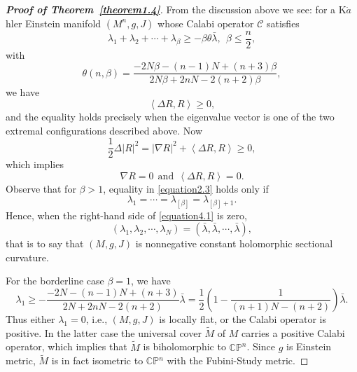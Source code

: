 \documentclass{amsart}
\theoremstyle{definition}
\theoremstyle{remark}
\numberwithin{equation}{section}
\begin{document}
\begin{proof}[{\bf Proof of Theorem~\ref{theorem1.4}}]
From the discussion above we see:  for a K$\ddot a$hler Einstein manifold $\left( M^n,g,J \right)$ whose Calabi operator $\mathcal{C}$ satisfies
 $${\lambda _1} + {\lambda _2} +  \cdots  + {\lambda _\beta} \ge  - \beta\theta \bar \lambda, \ \ \beta \le \frac{n}{2},$$
 with
$$ \theta \left( {n,\beta} \right) = \frac{{ - 2N\beta - \left( {n - 1} \right)N + \left( {n + 3} \right)\beta}}{{2N\beta + 2nN - 2\left( {n + 2} \right)\beta}},$$
we have
$$\left\langle {\Delta R,R} \right\rangle  \ge 0,$$
and the equality holds precisely when the eigenvalue vector is one of the two extremal configurations described above. Now
$$\frac{1}{2}\Delta {\left| R \right|^2} = {\left| {\nabla R} \right|^2} + \left\langle {\Delta R,R} \right\rangle  \ge 0,$$
which implies
$$\nabla R = 0\ \  \text{and} \ \ \left\langle {\Delta R,R} \right\rangle  = 0.$$
Observe that for $\beta >1$, equality in \eqref{equation2.3} holds  only if
$${\lambda _1} =  \cdots  = {\lambda _{\left[ \beta\right]}} = {\lambda _{\left[ \beta \right] + 1}}.$$
Hence, when the right-hand side of \eqref{equation4.1} is zero,
$$\left( {{\lambda _1},{\lambda _2}, \cdots ,{\lambda _N}} \right) = \left( {\bar \lambda ,\bar \lambda , \cdots ,\bar \lambda } \right),$$
that is to say that $\left( M,g,J \right)$ is nonnegative constant holomorphic sectional curvature.

For the borderline case $\beta=1$, we have
$${\lambda _1} \ge  - \frac{{ - 2N - \left( {n - 1} \right)N + \left( {n + 3} \right)}}{{2N + 2nN - 2\left( {n + 2} \right)}}\bar \lambda  = \frac{1}{2}\left( {1 - \frac{1}{{\left( {n + 1} \right)N - \left( {n + 2} \right)}}} \right)\bar \lambda.$$
Thus either ${\lambda _1}=0$, i.e., $\left( M,g,J \right)$ is  locally flat, or the Calabi operator is positive. In the latter case the universal cover $\widetilde M$ of $M$ carries a positive Calabi operator, which implies that $\widetilde M$ is biholomorphic to ${\mathbb{CP}{^n}}$. Since $g$ is Einstein metric,  $\widetilde M$ is in fact isometric to ${\mathbb{CP}{^n}}$ with the Fubini-Study metric.
\end{proof}








\end{document}
